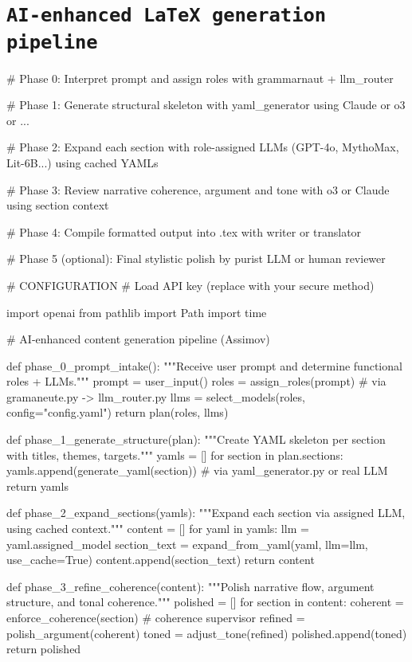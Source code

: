 \documentclass[12pt,a4paper]{article}
\begin{document}
			
			
			\section*{\texttt{AI-enhanced LaTeX generation pipeline}}
			
			\begin{metaoutput}
# Phase 0: Interpret prompt and assign roles with grammarnaut + llm_router

# Phase 1: Generate structural skeleton with yaml_generator using Claude or o3 or ...

# Phase 2: Expand each section with role-assigned LLMs (GPT-4o, MythoMax, Lit-6B...) using cached YAMLs

# Phase 3: Review narrative coherence, argument and tone with o3 or Claude using section context

# Phase 4: Compile formatted output into .tex with writer or translator

# Phase 5 (optional): Final stylistic polish by purist LLM or human reviewer

# CONFIGURATION
# Load API key (replace with your secure method)

import openai
from pathlib import Path
import time

				
# AI-enhanced content generation pipeline (Assimov)

def phase_0_prompt_intake():
    """Receive user prompt and determine functional roles + LLMs."""
    prompt = user_input()
    roles = assign_roles(prompt)  # via gramaneute.py -> llm_router.py
    llms = select_models(roles, config="config.yaml")
    return plan(roles, llms)

def phase_1_generate_structure(plan):
    """Create YAML skeleton per section with titles, themes, targets."""
    yamls = []
    for section in plan.sections:
    yamls.append(generate_yaml(section))  # via yaml_generator.py or real LLM
    return yamls

def phase_2_expand_sections(yamls):
    """Expand each section via assigned LLM, using cached context."""
    content = []
    for yaml in yamls:
        llm = yaml.assigned_model
        section_text = expand_from_yaml(yaml, llm=llm, use_cache=True)
        content.append(section_text)
    return content

def phase_3_refine_coherence(content):
    """Polish narrative flow, argument structure, and tonal coherence."""
    polished = []
    for section in content:
        coherent = enforce_coherence(section)  # coherence supervisor
        refined = polish_argument(coherent)
        toned = adjust_tone(refined)
        polished.append(toned)
    return polished


\end{metaoutput}
\end{document}
